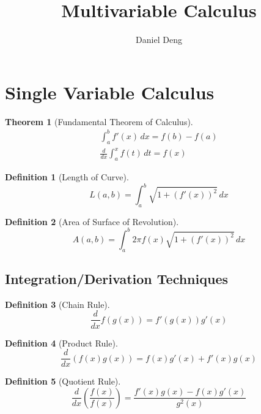 \documentclass[11pt]{article}
\title{Multivariable Calculus}
\author{Daniel Deng}
\date{}
\newtheorem{theorem}{Theorem}[section]
\theoremstyle{definition}
\newtheorem{definition}{Definition}[section]
\theoremstyle{remark}
\begin{document}
\maketitle

\section{Single Variable Calculus}
\begin{theorem}[Fundamental Theorem of Calculus]
\begin{align}
\int_a^b f'(x)\, dx = f(b) - f(a) \\
\frac{d}{dx} \int_a^x f(t)\, dt = f(x)
\end{align}
\end{theorem}

\begin{definition}[Length of Curve] \begin{equation}
L(a,b) = \int_a^b \sqrt{1+(f'(x))^2} \, dx
\end{equation}
\end{definition}

\begin{definition}[Area of Surface of Revolution] \begin{equation}
A(a,b) = \int_a^b 2\pi f(x) \sqrt{1+(f'(x))^2} \, dx
\end{equation}
\end{definition}

\subsection{Integration/Derivation Techniques}
\begin{definition}[Chain Rule]\begin{equation}
\frac{d}{dx}f(g(x))=f'(g(x))g'(x)
\end{equation}
\end{definition}

\begin{definition}[Product Rule]
\begin{equation}
\frac{d}{dx}(f(x)g(x))=f(x)g'(x)+f'(x)g(x)
\end{equation}
\end{definition}

\begin{definition}[Quotient Rule]
\begin{equation}
\frac{d}{dx}(\frac{f(x)}{f(x)})=\frac{f'(x)g(x)-f(x)g'(x)}{g^2(x)}
\end{equation}
\end{definition}
\end{document}
